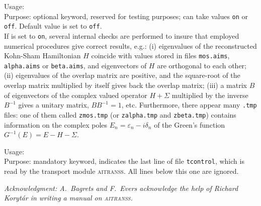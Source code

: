 
{
 \noindent 
 Usage:  \quad {} \\[1.0ex]
 Purpose: optional keyword, reserved for testing purposes; 
 can take values \texttt{on} or \texttt{off}.  Default value is set to
 \texttt{off}. \\
} 
If  is set to \texttt{on}, several internal checks
are performed to insure that employed numerical procedures give
correct results, e.g.: (i) eigenvalues of the reconstructed Kohn-Sham
Hamiltonian $H$ coincide with values stored in files \verb,mos.aims,,
\verb,alpha.aims, or \verb,beta.aims,, and eigenvectors of $H$ are
orthogonal to each other; (ii) eigenvalues of the overlap matrix are
positive, and the square-root of the overlap matrix multiplied by itself
gives back the overlap matrix; (iii) a matrix $B$ of eigenvectors of
the complex valued operator $H + \Sigma$ multiplied by the inverse
$B^{-1}$ gives a unitary matrix, $BB^{-1} = 1$, etc.  Furthermore,
there appear many \verb,.tmp, files: one of them called \verb,zmos.tmp,
(or \verb,zalpha.tmp, and \verb,zbeta.tmp,) contains information on the
complex poles $E_n = \varepsilon_n - i \delta_n$ of the Green's function
$G^{-1}(E) =  E - H - \Sigma$.

\newpage


{
 \noindent 
 Usage:   \\[1.0ex] 
 Purpose: mandatory keyword, indicates the last line of file 
 \texttt{tcontrol}, which is read by the transport module 
 \textsc{aitranss}. All lines below this one are ignored. \\
} 
\bigskip

\textit{Acknowledgment: A.~Bagrets and F.~Evers acknowledge the help of
Richard Koryt\'{a}r in writing a manual on \textsc{aitranss}.}

